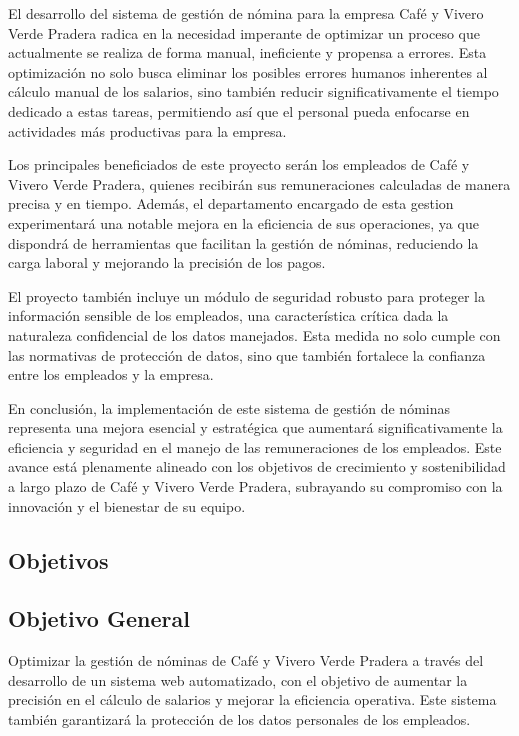 El desarrollo del sistema de gestión de nómina para la empresa Café y
Vivero Verde Pradera radica en la necesidad imperante de optimizar un
proceso que actualmente se realiza de forma manual, ineficiente y
propensa a errores. Esta optimización no solo busca eliminar los posibles
errores humanos inherentes al cálculo manual de los salarios,
sino también reducir significativamente el tiempo dedicado a estas tareas,
permitiendo así que el personal pueda enfocarse en actividades más productivas
para la empresa.

Los principales beneficiados de este proyecto serán los empleados de Café y
Vivero Verde Pradera, quienes recibirán sus remuneraciones calculadas de
manera precisa y en tiempo. Además, el departamento encargado de esta gestion
experimentará una notable mejora en la eficiencia de sus operaciones,
ya que dispondrá de herramientas que facilitan la gestión de nóminas,
reduciendo la carga laboral y mejorando la precisión de los pagos.

El proyecto también incluye un módulo de seguridad robusto para proteger la
información sensible de los empleados, una característica crítica dada la
naturaleza confidencial de los datos manejados. Esta medida no solo cumple
con las normativas de protección de datos, sino que también fortalece la
confianza entre los empleados y la empresa.

En conclusión, la implementación de este sistema de gestión de nóminas
representa una mejora esencial y estratégica que aumentará significativamente
la eficiencia y seguridad en el manejo de las remuneraciones de los empleados.
Este avance está plenamente alineado con los objetivos de crecimiento y
sostenibilidad a largo plazo de Café y Vivero Verde Pradera, subrayando su
compromiso con la innovación y el bienestar de su equipo.

\subsection{Objetivos}

\subsection{Objetivo General}
Optimizar la gestión de nóminas de Café y Vivero Verde Pradera a través
del desarrollo de un sistema web automatizado, con el objetivo de aumentar
la precisión en el cálculo de salarios y mejorar la eficiencia operativa.
Este sistema también garantizará la protección de los datos personales de
los empleados.

